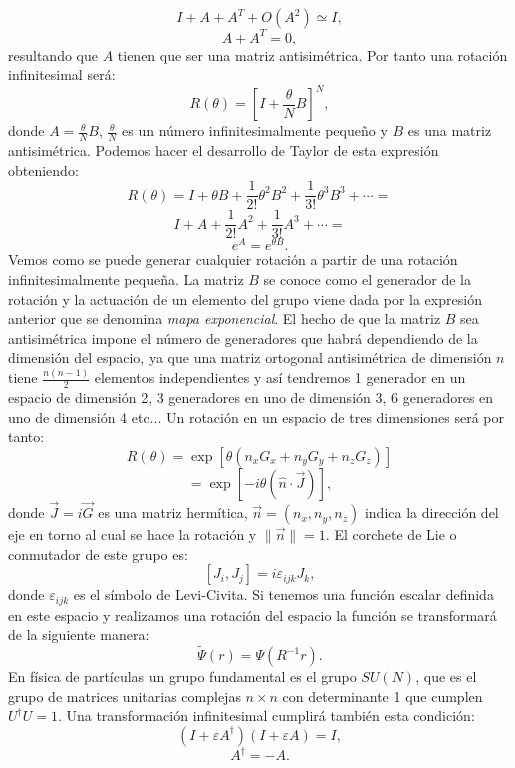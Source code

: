 \documentclass{article}
\theoremstyle{plain}
\theoremstyle{definition}
\newcommand{\norm}[1]{{\|{#1}\|}}
\begin{document}
	\[I+A+A^T+O(A^2)\simeq I,\]
	\[A+A^T =0,\] resultando que \(A\) tienen que ser una matriz antisimétrica. Por tanto una rotación infinitesimal será: \[R(\theta)= \left[I+\frac{\theta}{N} B\right]^N,\] donde \(A=\frac{\theta}{N}B\), \(\frac{\theta}{N}\) es un número infinitesimalmente pequeño y \(B\) es una matriz antisimétrica. Podemos hacer el desarrollo de Taylor de esta expresión obteniendo: \[R(\theta) = I + \theta B +\frac{1}{2!}\theta^2B^2 + \frac{1}{3!}\theta^3B^3 + \cdots = \]\[I + A +\frac{1}{2!}A^2 + \frac{1}{3!}A^3 + \cdots =\]\[e^A = e^{\theta B}\text{.} \] Vemos como se puede generar cualquier rotación a partir de una rotación infinitesimalmente pequeña. La matriz \(B\) se conoce como el generador de la rotación y la actuación de un elemento del grupo viene dada por la expresión anterior que se denomina \textit{mapa exponencial}. El hecho de que la matriz \(B\) sea antisimétrica impone el número de generadores que habrá dependiendo de la dimensión del espacio, ya que una matriz ortogonal antisimétrica de dimensión \(n\) tiene \(\frac{n(n-1)}{2}\) elementos independientes y así tendremos 1 generador en un espacio de dimensión 2, 3 generadores en uno de dimensión 3, 6 generadores en uno de dimensión 4 etc... Un rotación en un espacio de tres dimensiones será por tanto: \[R(\theta)= \exp\left[\theta \left(n_xG_x+n_yG_y+n_zG_z\right)\right]\]
	\[=
	\exp\left[-i\theta(\hat{n}\cdot\vec{J})\right] ,\]
	donde \(\vec{J}=i\vec{G}\) es una matriz hermítica, \(\vec{n} = \left(n_x,n_y,n_z\right)\)  indica la dirección del eje en torno al cual se hace la rotación y \(\norm{\vec{n}} = 1 \text{.} \) El corchete de Lie o conmutador de este grupo es: \[
	\left[J_i,J_j\right] = i\varepsilon_{ijk}J_k,
	\] donde \(\varepsilon_{ijk} \) es el símbolo de Levi-Civita. Si tenemos una función escalar definida en este espacio y realizamos una rotación del espacio la función se transformará de la siguiente manera:\[\tilde{\Psi}(r) = \Psi(R^{-1}r)\text{.} \] \newline 
	En física de partículas un grupo fundamental es el grupo \(SU(N)\), que es el grupo de matrices unitarias complejas \(n\times n\) con determinante 1 que cumplen \(U^\dagger U = 1 \). Una transformación infinitesimal cumplirá también esta condición: \[(I+\varepsilon A^{\dagger})(I+\varepsilon A) = I, \] \[A^\dagger = -A\text{.} \]
\end{document}
